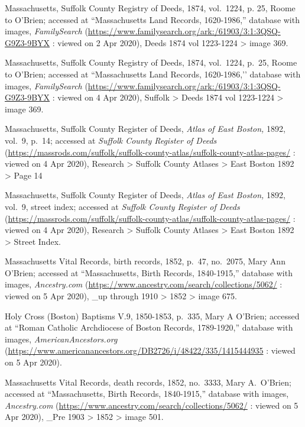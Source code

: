 \begin{thebibliography}{999}
	Massachusetts, Suffolk County Registry of Deeds, 1874, vol.\ 1224, p. 25, Roome to O'Brien; accessed at ``Massachusetts Land Records, 1620-1986,'' database with images, \textit{FamilySearch} (\url{https://www.familysearch.org/ark:/61903/3:1:3QSQ-G9Z3-9BYX} : viewed on 2 Apr 2020), Deeds 1874 vol 1223-1224 > image 369.
	
	Massachusetts, Suffolk County Registry of Deeds, 1874, vol.\ 1224, p.\ 25, Roome to O’Brien; accessed at ``Massachusetts Land Records, 1620-1986,’’ database with images, \textit{FamilySearch} (\url{https://www.familysearch.org/ark:/61903/3:1:3QSQ-G9Z3-9BYX} : viewed on 4 Apr 2020), Suffolk > Deeds 1874 vol 1223-1224 > image 369.
	
	Massachusetts, Suffolk County Register of Deeds, \textit{Atlas of East Boston,} 1892, vol.\ 9, p.\ 14; accessed at \textit{Suffolk County Register of Deeds} (\url{https://massrods.com/suffolk/suffolk-county-atlas/suffolk-county-atlas-pages/} : viewed on 4 Apr 2020), Research > Suffolk County Atlases > East Boston 1892 > Page 14
	
	Massachusetts, Suffolk County Register of Deeds, \textit{Atlas of East Boston,} 1892, vol.\ 9, street index; accessed at \textit{Suffolk County Register of Deeds} (\url{https://massrods.com/suffolk/suffolk-county-atlas/suffolk-county-atlas-pages/} : viewed on 4 Apr 2020), Research > Suffolk County Atlases > East Boston 1892 > Street Index.
	
	Massachusetts Vital Records, birth records, 1852, p.\ 47, no.\ 2075, Mary Ann O'Brien; accessed at ``Massachusetts, Birth Records, 1840-1915,'' database with images, \textit{Ancestry.com} (\url{https://www.ancestry.com/search/collections/5062/} : viewed on 5 Apr 2020), \_up through 1910 > 1852 > image 675.
	
	Holy Cross (Boston) Baptisms V.9, 1850-1853, p.\ 335, Mary A O'Brien; accessed at ``Roman Catholic Archdiocese of Boston Records, 1789-1920,'' database with images, \textit{AmericanAncestors.org} (\url{https://www.americanancestors.org/DB2726/i/48422/335/1415444935} : viewed on 5 Apr 2020).
	
	Massachusetts Vital Records, death records, 1852, no.\ 3333, Mary A.\ O'Brien; accessed at ``Massachusetts, Birth Records, 1840-1915,'' database with images, \textit{Ancestry.com} (\url{https://www.ancestry.com/search/collections/5062/} : viewed on 5 Apr 2020), \_Pre 1903 > 1852 > image 501.
	

\end{thebibliography}

